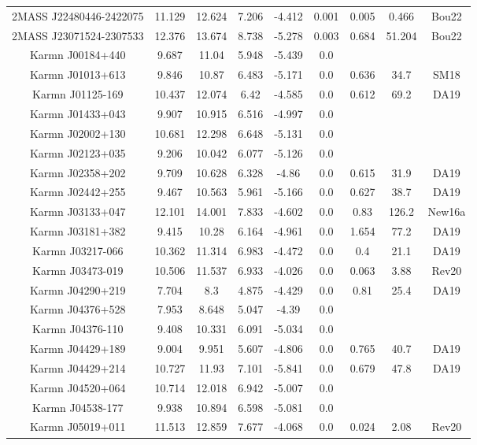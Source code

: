 \begin{longtable}{ccccccccc}
    2MASS J22480446-2422075 & 11.129 & 12.624 & 7.206 & -4.412 & 0.001 & 0.005 & 0.466 & Bou22 \\
    2MASS J23071524-2307533 & 12.376 & 13.674 & 8.738 & -5.278 & 0.003 & 0.684 & 51.204 & Bou22 \\
    Karmn J00184+440 & 9.687 & 11.04 & 5.948 & -5.439 & 0.0 &  &  &  \\
    Karmn J01013+613 & 9.846 & 10.87 & 6.483 & -5.171 & 0.0 & 0.636 & 34.7 & SM18 \\
    Karmn J01125-169 & 10.437 & 12.074 & 6.42 & -4.585 & 0.0 & 0.612 & 69.2 & DA19 \\
    Karmn J01433+043 & 9.907 & 10.915 & 6.516 & -4.997 & 0.0 &  &  &  \\
    Karmn J02002+130 & 10.681 & 12.298 & 6.648 & -5.131 & 0.0 &  &  &  \\
    Karmn J02123+035 & 9.206 & 10.042 & 6.077 & -5.126 & 0.0 &  &  &  \\
    Karmn J02358+202 & 9.709 & 10.628 & 6.328 & -4.86 & 0.0 & 0.615 & 31.9 & DA19 \\
    Karmn J02442+255 & 9.467 & 10.563 & 5.961 & -5.166 & 0.0 & 0.627 & 38.7 & DA19 \\
    Karmn J03133+047 & 12.101 & 14.001 & 7.833 & -4.602 & 0.0 & 0.83 & 126.2 & New16a \\
    Karmn J03181+382 & 9.415 & 10.28 & 6.164 & -4.961 & 0.0 & 1.654 & 77.2 & DA19 \\
    Karmn J03217-066 & 10.362 & 11.314 & 6.983 & -4.472 & 0.0 & 0.4 & 21.1 & DA19 \\
    Karmn J03473-019 & 10.506 & 11.537 & 6.933 & -4.026 & 0.0 & 0.063 & 3.88 & Rev20 \\
    Karmn J04290+219 & 7.704 & 8.3 & 4.875 & -4.429 & 0.0 & 0.81 & 25.4 & DA19 \\
    Karmn J04376+528 & 7.953 & 8.648 & 5.047 & -4.39 & 0.0 &  &  &  \\
    Karmn J04376-110 & 9.408 & 10.331 & 6.091 & -5.034 & 0.0 &  &  &  \\
    Karmn J04429+189 & 9.004 & 9.951 & 5.607 & -4.806 & 0.0 & 0.765 & 40.7 & DA19 \\
    Karmn J04429+214 & 10.727 & 11.93 & 7.101 & -5.841 & 0.0 & 0.679 & 47.8 & DA19 \\
    Karmn J04520+064 & 10.714 & 12.018 & 6.942 & -5.007 & 0.0 &  &  &  \\
    Karmn J04538-177 & 9.938 & 10.894 & 6.598 & -5.081 & 0.0 &  &  &  \\
    Karmn J05019+011 & 11.513 & 12.859 & 7.677 & -4.068 & 0.0 & 0.024 & 2.08 & Rev20 \\

\end{longtable}
